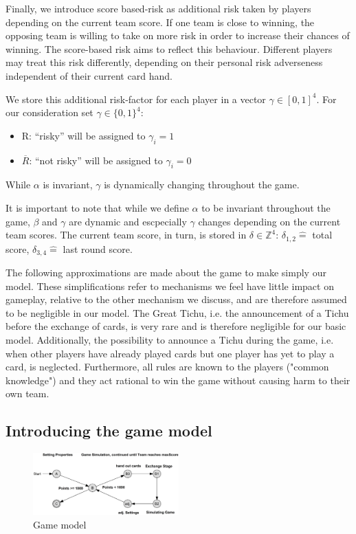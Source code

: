 Finally, we introduce score based-risk as additional risk taken by players depending on the current team score. If one team is close to winning, the opposing team is willing to take on more risk in order to increase their chances of winning. The score-based risk aims to reflect this behaviour. Different players may treat this risk differently, depending on their personal risk adverseness independent of their current card hand.

 We store this additional risk-factor for each player in a vector $\gamma \in [0,1]^4$. For our consideration set  $\gamma \in \{0,1\}^4$: \\
\begin{itemize}
\item R: “risky” will be assigned to $\gamma_i = 1$
\item $\overline{R}$: “not risky” will be assigned to $\gamma_i = 0$ \\
\end{itemize}
While $\alpha$ is invariant, $\gamma$ is dynamically changing throughout the game. 

It is important to note that while we define $\alpha$ to be invariant throughout the game, $\beta$ and $\gamma$ are dynamic and escpecially $\gamma$ changes depending on the current team scores. The current team score, in turn, is stored in $\delta \in \mathbb{Z}^4$: $\delta_{1,2} \widehat{=}$ total score, $\delta_{3,4} \widehat{=}$ last round score.

The following approximations are made about the game to make simply our model. These simplifications refer to mechanisms we feel have little impact on gameplay, relative to the other mechanism we discuss, and are therefore assumed to be negligible in our model. The Great Tichu, i.e. the announcement of a Tichu before the exchange of cards, is very rare and is therefore negligible for our basic model. Additionally, the possibility to announce a Tichu during the game, i.e. when other players have already played cards but one player has yet to play a card, is neglected. Furthermore, all rules are known to the players ("common knowledge") and they act rational to win the game without causing harm to their own team.

\subsection{Introducing the game model}

\begin{figure}[h]
    \centering
    \includegraphics[width=0.5\textwidth]{Bilder/graph}
    \caption{Game model}
    \label{fig:1}
\end{figure}

